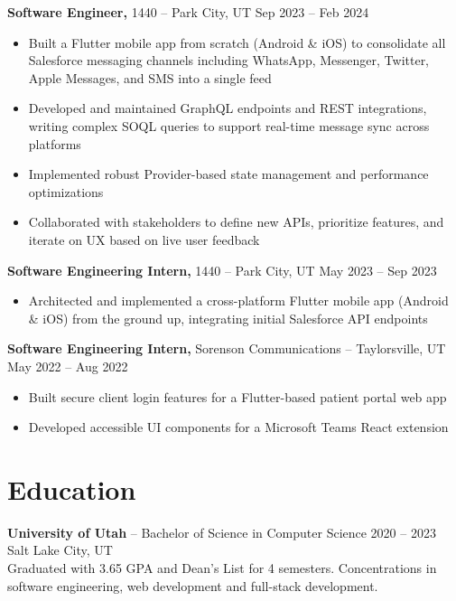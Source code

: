 \documentclass[11pt]{article}       %
\begin{document}
\textbf{Software Engineer,} 1440 -- Park City, UT \hfill Sep 2023 -- Feb 2024 \\
\vspace{-9pt}
\begin{itemize}
  \item Built a Flutter mobile app from scratch (Android \& iOS) to consolidate all Salesforce messaging channels including WhatsApp, Messenger, Twitter, Apple Messages, and SMS into a single feed
  \item Developed and maintained GraphQL endpoints and REST integrations, writing complex SOQL queries to support real-time message sync across platforms
  \item Implemented robust Provider-based state management and performance optimizations
  \item Collaborated with stakeholders to define new APIs, prioritize features, and iterate on UX based on live user feedback
\end{itemize}

\textbf{Software Engineering Intern,} 1440 -- Park City, UT \hfill May 2023 -- Sep 2023 \\
\vspace{-9pt}
\begin{itemize}
  \item Architected and implemented a cross-platform Flutter mobile app (Android \& iOS) from the ground up, integrating initial Salesforce API endpoints
\end{itemize}

\textbf{Software Engineering Intern,} Sorenson Communications -- Taylorsville, UT \hfill May 2022 -- Aug 2022 \\
\vspace{-9pt}
\begin{itemize}
  \item Built secure client login features for a Flutter-based patient portal web app
  \item Developed accessible UI components for a Microsoft Teams React extension
\end{itemize}


\vspace{-18.5pt}

\section*{Education}
\textbf{University of Utah} -- Bachelor of Science in Computer Science \hfill 2020 -- 2023 \\
Salt Lake City, UT \\
Graduated with 3.65 GPA and Dean's List for 4 semesters. Concentrations in software engineering, web development and full-stack development.
\end{document}
